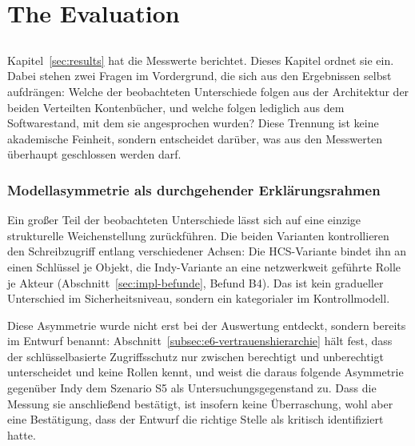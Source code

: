 \part{The Evaluation}
\chapter{}
\label{sec:discussion}

Kapitel~\ref{sec:results} hat die Messwerte berichtet. Dieses Kapitel ordnet sie ein. Dabei stehen zwei Fragen im Vordergrund, die sich aus den Ergebnissen selbst aufdrängen: Welche der beobachteten Unterschiede folgen aus der Architektur der beiden Verteilten Kontenbücher, und welche folgen lediglich aus dem Softwarestand, mit dem sie angesprochen wurden? Diese Trennung ist keine akademische Feinheit, sondern entscheidet darüber, was aus den Messwerten überhaupt geschlossen werden darf.

\section{Modellasymmetrie als durchgehender Erklärungsrahmen}
\label{sec:discussion-asymmetrie}

Ein großer Teil der beobachteten Unterschiede lässt sich auf eine einzige strukturelle Weichenstellung zurückführen. Die beiden Varianten kontrollieren den Schreibzugriff entlang verschiedener Achsen: Die HCS-Variante bindet ihn an einen Schlüssel je Objekt, die Indy-Variante an eine netzwerkweit geführte Rolle je Akteur (Abschnitt~\ref{sec:impl-befunde}, Befund B4). Das ist kein gradueller Unterschied im Sicherheitsniveau, sondern ein kategorialer im Kontrollmodell.

Diese Asymmetrie wurde nicht erst bei der Auswertung entdeckt, sondern bereits im Entwurf benannt: Abschnitt~\ref{subsec:e6-vertrauenshierarchie} hält fest, dass der schlüsselbasierte Zugriffsschutz nur zwischen berechtigt und unberechtigt unterscheidet und keine Rollen kennt, und weist die daraus folgende Asymmetrie gegenüber Indy dem Szenario S5 als Untersuchungsgegenstand zu. Dass die Messung sie anschließend bestätigt, ist insofern keine Überraschung, wohl aber eine Bestätigung, dass der Entwurf die richtige Stelle als kritisch identifiziert hatte.

